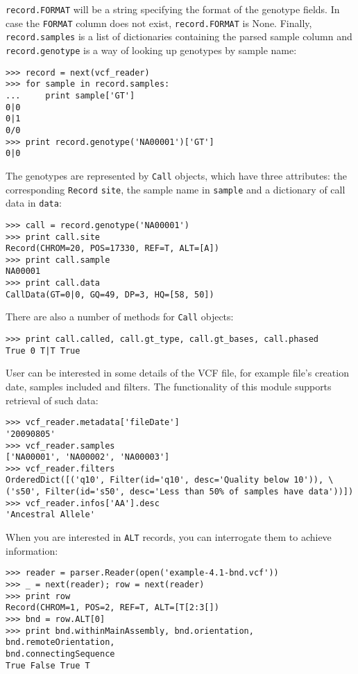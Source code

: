 \verb|record.FORMAT| will be a string specifying the format of the genotype fields. In case the \verb|FORMAT|
 column does not exist, \verb|record.FORMAT| is None. Finally, \verb|record.samples| is a list of dictionaries
 containing the parsed sample column and \verb|record.genotype| is a way of looking up genotypes by sample name:

 \begin{verbatim}
>>> record = next(vcf_reader)
>>> for sample in record.samples:
...     print sample['GT']
0|0
0|1
0/0
>>> print record.genotype('NA00001')['GT']
0|0
\end{verbatim}

\noindent The genotypes are represented by \verb|Call| objects, which have three attributes: the corresponding \verb|Record|
\verb|site|, the sample name in \verb|sample| and a dictionary of call data in \verb|data|:

\begin{verbatim}
>>> call = record.genotype('NA00001')
>>> print call.site
Record(CHROM=20, POS=17330, REF=T, ALT=[A])
>>> print call.sample
NA00001
>>> print call.data
CallData(GT=0|0, GQ=49, DP=3, HQ=[58, 50])
\end{verbatim}

\noindent There are also a number of methods for \verb|Call| objects:

\begin{verbatim}
>>> print call.called, call.gt_type, call.gt_bases, call.phased
True 0 T|T True
\end{verbatim}

\noindent User can be interested in some details of the VCF file, for example file's creation date, samples included
and filters. The functionality of this module supports retrieval of such data:

\begin{verbatim}
>>> vcf_reader.metadata['fileDate']
'20090805'
>>> vcf_reader.samples
['NA00001', 'NA00002', 'NA00003']
>>> vcf_reader.filters
OrderedDict([('q10', Filter(id='q10', desc='Quality below 10')), \
('s50', Filter(id='s50', desc='Less than 50% of samples have data'))])
>>> vcf_reader.infos['AA'].desc
'Ancestral Allele'
\end{verbatim}

\noindent When you are interested in \verb|ALT| records, you can interrogate them to achieve information:

\begin{verbatim}
>>> reader = parser.Reader(open('example-4.1-bnd.vcf'))
>>> _ = next(reader); row = next(reader)
>>> print row
Record(CHROM=1, POS=2, REF=T, ALT=[T[2:3[])
>>> bnd = row.ALT[0]
>>> print bnd.withinMainAssembly, bnd.orientation, bnd.remoteOrientation,
bnd.connectingSequence
True False True T
\end{verbatim}


